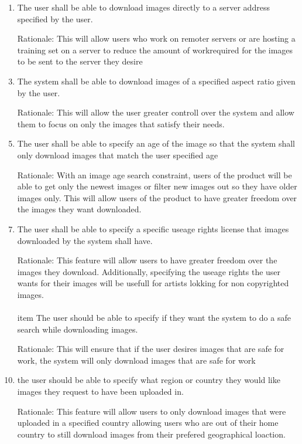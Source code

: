 \documentclass[12pt, titlepage]{article}
\begin{document}
\begin{enumerate}[label=FR\arabic*:, wide=0pt, leftmargin=*]
\item The user shall be able to download images directly to a server address specified by the user.
\item[Rationale:] This will allow users who work on remoter servers or are hosting a training set on a server to reduce the amount of workrequired for the images to be sent to the server they desire
\\
\item The system shall be able to download images of a specified aspect ratio given by the user.
\item[Rationale:] This will allow the user greater controll over the system and allow them to focus on only the images that satisfy their needs.
\\
\item The user shall be able to specify an age of the image so that the system shall only download images that match the user specified age
\item[Rationale:] With an image age search constraint, users of the product will be able to get only the newest images or filter new images out so they have older images only. This will allow users of the product to have greater freedom over the images they want downloaded.
\\
\item The user shall be able to specify a specific useage rights license that images downloaded by the system shall have.
\item[Rationale:] This feature will allow users to have greater freedom over the images they download. Additionally, specifying the useage rights the user wants for their images will be usefull for artists lokking for non copyrighted images.
\\
\\item The user should be able to specify if they want the system to do a safe search while downloading images.
\item[Rationale:] This will ensure that if the user desires images that are safe for work, the system will only download images that are safe for work
\\
\item the user should be able to specify what region or country they would like images they request to have been uploaded in.
\item[Rationale:] This feature will allow users to only download images that were uploaded in a specified country allowing users who are out of their home country to still download images from their prefered geographical loaction.
\\

\color{black}

\end{enumerate}
\end{document}

